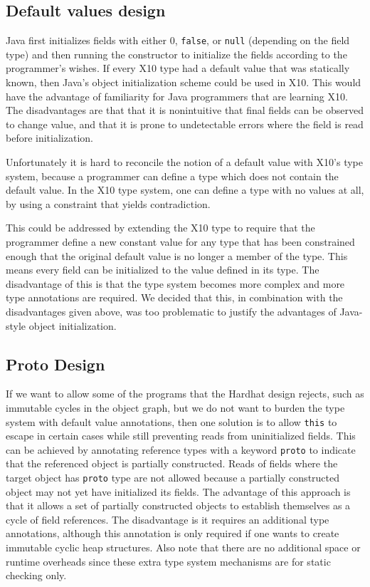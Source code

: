 

\subsection{Default values design}

Java first initializes fields with either $0$, \texttt{false}, or \texttt{null}
(depending on the field type) and then running the constructor to initialize
the fields according to the programmer's wishes.  If every X10 type had a
default value that was statically known, then Java's object initialization
scheme could be used in X10.  This would have the advantage of familiarity for
Java programmers that are learning X10.  The disadvantages are that that it is
nonintuitive that final fields can be observed to change value, and that it is
prone to undetectable errors where the field is read before initialization.

Unfortunately it is hard to reconcile the notion of a default value with X10's
type system, because a programmer can define a type which does not contain the
default value.  In the X10 type system, one can define a type with no values at
all, by using a constraint that yields contradiction.

This could be addressed by extending the X10 type to require that the
programmer define a new constant value for any type that has been constrained
enough that the original default value is no longer a member of the type.  This
means every field can be initialized to the value defined in its type.  The
disadvantage of this is that the type system becomes more complex and more type
annotations are required.  We decided that this, in combination with the
disadvantages given above, was too problematic to justify the advantages of
Java-style object initialization.

\subsection{Proto Design}

If we want to allow some of the programs that the Hardhat design rejects, such
as immutable cycles in the object graph, but we do not want to burden the type
system with default value annotations, then one solution is to allow
\texttt{this} to escape in certain cases while still preventing reads from
uninitialized fields.  This can be achieved by annotating reference types with
a keyword \texttt{proto} to indicate that the referenced object is partially
constructed.  Reads of fields where the target object has \texttt{proto} type
are not allowed because a partially constructed object may not yet have
initialized its fields.  The advantage of this approach is that it allows a set
of partially constructed objects to establish themselves as a cycle of field
references.  The disadvantage is it requires an additional type annotations,
although this annotation is only required if one wants to create immutable
cyclic heap structures.  Also note that there are no additional space or
runtime overheads since these extra type system mechanisms are for static
checking only.

